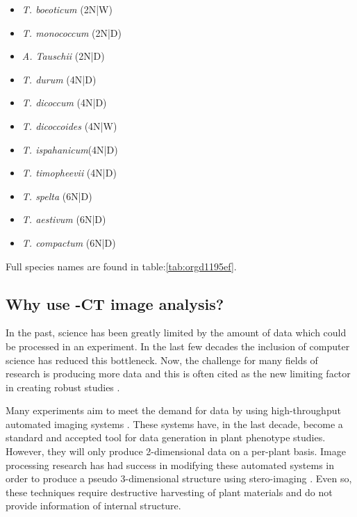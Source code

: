 \documentclass[11pt]{report}
\begin{document}
\begin{multicols}{3}

  \begin{itemize}
  \item{\textit{T. boeoticum} (2N|W)}
  \item{\textit{T. monococcum} (2N|D)}
  \item{\textit{A. Tauschii} (2N|D)}
  \end{itemize}

  \columnbreak

  \begin{itemize}
  \item{\textit{T. durum} (4N|D)}
  \item{\textit{T. dicoccum} (4N|D)}
  \item{\textit{T. dicoccoides} (4N|W)}
  \item{\textit{T. ispahanicum}(4N|D)}
  \item{\textit{T. timopheevii} (4N|D)}
  \end{itemize}

  \columnbreak

  \begin{itemize}
  \item{\textit{T. spelta} (6N|D)}
  \item{\textit{T. aestivum} (6N|D)}
  \item{\textit{T. compactum} (6N|D)}
  \end{itemize}

\end{multicols}
Full species names are found in table:\ref{tab:orgd1195ef}.

\subsection{Why use \textmu{}-CT image analysis?}
\label{sec:org866aad1}
In the past, science has been greatly limited by the amount of data which could be processed in an experiment. In the last few decades the inclusion of computer science has reduced this bottleneck. Now, the challenge for many fields of research is producing more data and this is often cited as the new limiting factor in creating robust studies \cite{Furbank2011}.

Many experiments aim to meet the demand for data by using high-throughput automated imaging systems \cite{Naumann2007,Prasanna2013,Humplik2015}. These systems have, in the last decade, become a standard and accepted tool for data generation in plant phenotype studies. However, they will only produce 2-dimensional data on a per-plant basis. Image processing research has had success in modifying these automated systems in order to produce a pseudo 3-dimensional structure using stero-imaging \cite{Roussel2016}. Even so, these techniques require destructive harvesting of plant materials and do not provide information of internal structure.
\end{document}
